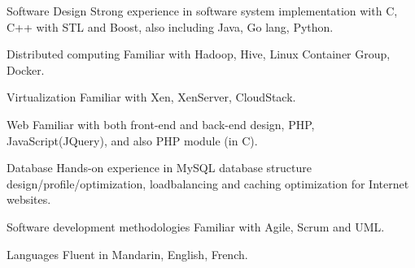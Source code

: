 


\begin{cvskills}

  \cvskill
    {Software Design} %
    {Strong experience in software system implementation with C, C++ with STL and Boost, also including Java, Go lang, Python.} %

  \cvskill
    {Distributed computing} %
    {Familiar with Hadoop, Hive, Linux Container Group, Docker.} %

  \cvskill
    {Virtualization} %
    {Familiar with Xen, XenServer, CloudStack.} %

  \cvskill
    {Web} %
    {Familiar with both front-end and back-end design, PHP, JavaScript(JQuery), and also PHP module (in C).} %

  \cvskill
    {Database} %
    {Hands-on experience in MySQL database structure design/profile/optimization, loadbalancing and caching optimization for Internet websites.} %

  \cvskill
    {Software development methodologies} %
    {Familiar with Agile, Scrum and UML.} %

  \cvskill
    {Languages} %
    {Fluent in Mandarin, English, French.} %


\end{cvskills}
